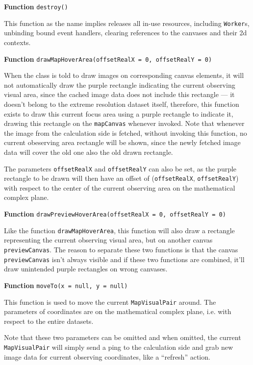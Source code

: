 \textbf{Function} \verb|destroy()|

This function as the name implies releases all in-use resources, including \texttt{Worker}s, unbinding bound event handlers, clearing references to the canvases and their 2d contexts.

\textbf{Function} \verb|drawMapHoverArea(offsetRealX = 0, offsetRealY = 0)|

When the class is told to draw images on corresponding canvas elements, it will not automatically draw the purple rectangle indicating the current observing visual area, since the cached image data does not include this rectangle --- it doesn't belong to the extreme resolution dataset itself, therefore, this function exists to draw this current focus area using a purple rectangle to indicate it, drawing this rectangle on the \texttt{mapCanvas} whenever invoked. Note that whenever the image from the calculation side is fetched, without invoking this function, no current obeserving area rectangle will be shown, since the newly fetched image data will cover the old one also the old drawn rectangle.

The parameters \texttt{offsetRealX} and \texttt{offsetRealY} can also be set, as the purple rectangle to be drawn will then have an offset of (\texttt{offsetRealX}, \texttt{offsetRealY}) with respect to the center of the current observing area on the mathematical complex plane.

\textbf{Function} \verb|drawPreviewHoverArea(offsetRealX = 0, offsetRealY = 0)|

Like the function \texttt{drawMapHoverArea}, this function will also draw a rectangle representing the current observing visual area, but on another canvas \texttt{previewCanvas}. The reason to separate these two functions is that the canvas \texttt{previewCanvas} isn't always visible and if these two functions are combined, it'll draw unintended purple rectangles on wrong canvases.

\textbf{Function} \verb|moveTo(x = null, y = null)|

This function is used to move the current \texttt{MapVisualPair} around. The parameters of coordinates are on the mathematical complex plane, i.e. with respect to the entire datasets.

Note that these two parameters can be omitted and when omitted, the current \texttt{MapVisualPair} will simply send a ping to the calculation side and grab new image data for current observing coordinates, like a ``refresh'' action.

